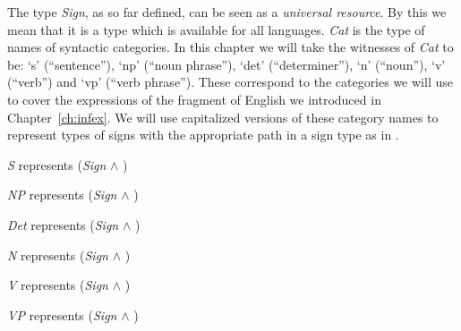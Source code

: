 The type \textit{Sign}, as so far defined, can be seen as a
\textit{universal resource}.  By this we mean that it is a type which
is available for all languages. 
\textit{Cat} is the type of names of syntactic categories.  In this chapter we
will take the witnesses of \textit{Cat} to be: `s' (``sentence''), `np' (``noun phrase''),
`det' (``determiner''), `n' (``noun''), `v' (``verb'') and `vp' (``verb
phrase'').  These correspond to the categories we will use to cover
the expressions of the fragment of English we introduced in
Chapter~\ref{ch:infex}. We will use capitalized versions of these
category names to represent types of signs with the appropriate path in a
sign type as in \nexteg{}.
\begin{ex} 
\begin{subex} 

\item \textit{S} represents (\textit{Sign} \d{$\wedge$} )
 
\item \textit{NP} represents  (\textit{Sign} \d{$\wedge$} ) 
 
\item \textit{Det} represents
   (\textit{Sign} \d{$\wedge$} )

\item \textit{N} represents
   (\textit{Sign} \d{$\wedge$} ) 

\item \textit{V} represents
   (\textit{Sign} \d{$\wedge$} )

\item \textit{VP} represents  (\textit{Sign} \d{$\wedge$} )
 
\end{subex}
\label{ex:catsigntypes}   
\end{ex}


